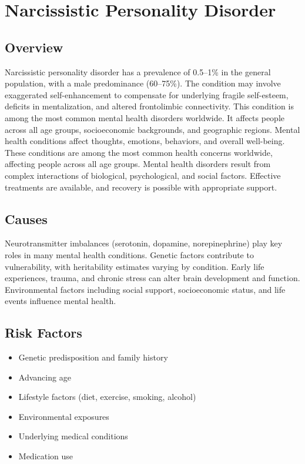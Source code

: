 \chapter{Narcissistic Personality Disorder}
\label{sec:Narcissistic Personality Disorder}

\section{Overview}
Narcissistic personality disorder has a prevalence of 0.5--1\% in the general population, with a male predominance (60--75\%). The condition may involve exaggerated self-enhancement to compensate for underlying fragile self-esteem, deficits in mentalization, and altered frontolimbic connectivity. This condition is among the most common mental health disorders worldwide. It affects people across all age groups, socioeconomic backgrounds, and geographic regions. Mental health conditions affect thoughts, emotions, behaviors, and overall well-being. These conditions are among the most common health concerns worldwide, affecting people across all age groups. Mental health disorders result from complex interactions of biological, psychological, and social factors. Effective treatments are available, and recovery is possible with appropriate support.
\section{Causes}
Neurotransmitter imbalances (serotonin, dopamine, norepinephrine) play key roles in many mental health conditions. Genetic factors contribute to vulnerability, with heritability estimates varying by condition. Early life experiences, trauma, and chronic stress can alter brain development and function. Environmental factors including social support, socioeconomic status, and life events influence mental health.   
\section{Risk Factors}
\begin{itemize}[noitemsep]
  \item Genetic predisposition and family history
  \item Advancing age
  \item Lifestyle factors (diet, exercise, smoking, alcohol)
  \item Environmental exposures
  \item Underlying medical conditions
  \item Medication use
\end{itemize}

